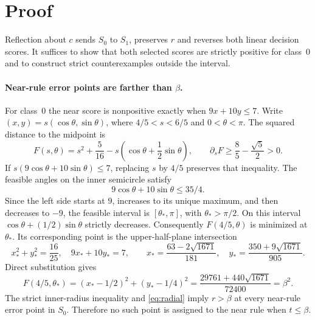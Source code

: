\documentclass[11pt,a4paper]{article}
\numberwithin{equation}{section}
\begin{document}
\section{Proof}
Reflection about $c$ sends $S_0$ to $S_1$, preserves $r$ and reverses both linear decision scores. It suffices to show that both selected scores are strictly positive for class~0 and to construct strict counterexamples outside the interval.

\paragraph{Near-rule error points are farther than $\beta$.}
For class~0 the near score is nonpositive exactly when $9x+10y\leq7$. Write $(x,y)=s(\cos\theta,\sin\theta)$, where $4/5<s<6/5$ and $0<\theta<\pi$. The squared distance to the midpoint is
\begin{equation}
F(s,\theta)=s^2+\frac5{16}-s\left(\cos\theta+\frac12\sin\theta\right),
\qquad
\partial_s F\geq\frac85-\frac{\sqrt5}{2}>0.
\label{eq:radial}
\end{equation}
If $s(9\cos\theta+10\sin\theta)\leq7$, replacing $s$ by $4/5$ preserves that inequality. The feasible angles on the inner semicircle satisfy
\[
9\cos\theta+10\sin\theta\leq35/4.
\]
Since the left side starts at $9$, increases to its unique maximum, and then decreases to $-9$, the feasible interval is $[\theta_*,\pi]$, with $\theta_*>\pi/2$. On this interval $\cos\theta+(1/2)\sin\theta$ strictly decreases. Consequently $F(4/5,\theta)$ is minimized at $\theta_*$. Its corresponding point is the upper-half-plane intersection
\begin{equation}
x_*^2+y_*^2=\frac{16}{25},\quad 9x_*+10y_*=7,\qquad
x_*=\frac{63-2\sqrt{1671}}{181},\quad
y_* =\frac{350+9\sqrt{1671}}{905}.
\end{equation}
Direct substitution gives
\begin{equation}
F(4/5,\theta_*)=(x_*-1/2)^2+(y_*-1/4)^2
=\frac{29761+440\sqrt{1671}}{72400}=\beta^2.
\end{equation}
The strict inner-radius inequality and \eqref{eq:radial} imply $r>\beta$ at every near-rule error point in $S_0$. Therefore no such point is assigned to the near rule when $t\leq\beta$.
\end{document}
